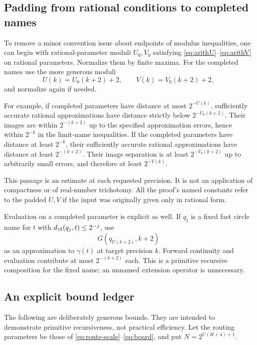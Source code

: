 \subsection{Padding from rational conditions to completed names}
\label{sec:padding}

To remove a minor convention issue about endpoints of modulus
inequalities, one can begin with rational-parameter moduli
$U_0,V_0$ satisfying \eqref{eq:arithU}--\eqref{eq:arithV}
on rational parameters. Normalize them by finite maxima.
For the completed names use the more generous moduli
\begin{equation}
        U(k)=U_0(k+2)+2,\qquad V(k)=V_0(k+2)+2,
 \label{eq:padded}
\end{equation}
and normalize again if needed.

For example, if completed parameters have distance
at most $2^{-U(k)}$, sufficiently accurate rational approximations
have distance strictly below $2^{-U_0(k+2)}$. Their images
are within $2^{-(k+2)}$ up to the specified approximation
errors, hence within $2^{-k}$ in the limit-name inequalities.
If the completed parameters have distance at least $2^{-k}$,
their sufficiently accurate rational approximations have distance
at least $2^{-(k+2)}$. Their image separation is at least
$2^{-V_0(k+2)}$ up to arbitrarily small errors, and therefore
at least $2^{-V(k)}$.

This passage is an estimate at each requested precision.
It is not an application of compactness or of real-number
trichotomy. All the proof's named constants refer to the padded
$U,V$ if the input was originally given only in rational form.

Evaluation on a completed parameter is explicit as well.
If $q_j$ is a fixed fast circle name for $t$ with
$d_\T(q_j,t)\le2^{-j}$, use
\[
                    G(q_{U(k+2)},k+2)
\]
as an approximation to $\gamma(t)$ at target precision $k$.
Forward continuity and evaluation contribute at most
$2^{-(k+2)}$ each. This is a primitive recursive composition
for the fixed name; an unnamed extension operator is unnecessary.

\subsection{An explicit bound ledger}
\label{sec:bounds}

The following are deliberately generous bounds. They are intended
to demonstrate primitive recursiveness, not practical efficiency.
Let the routing parameters be those of
\eqref{eq:route-scale}--\eqref{eq:board}, and put
$N=2^{U(H+4)+1}$.

